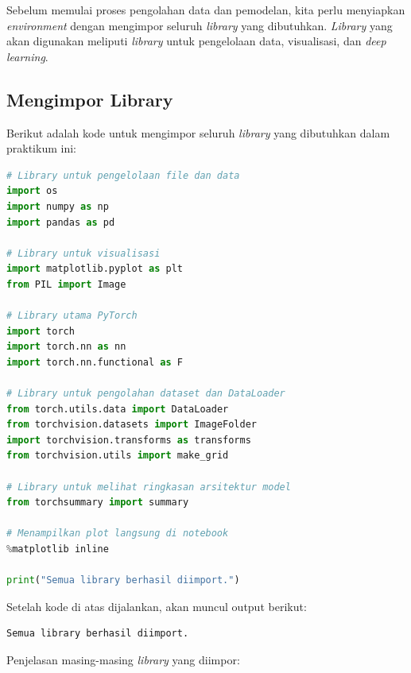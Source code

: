 Sebelum memulai proses pengolahan data dan pemodelan, kita perlu menyiapkan \textit{environment} dengan mengimpor seluruh \textit{library} yang dibutuhkan. \textit{Library} yang akan digunakan meliputi \textit{library} untuk pengelolaan data, visualisasi, dan \textit{deep learning}.

\subsection{Mengimpor Library}

Berikut adalah kode untuk mengimpor seluruh \textit{library} yang dibutuhkan dalam praktikum ini:

\begin{lstlisting}[language=Python, caption=Mengimpor library yang dibutuhkan]
# Library untuk pengelolaan file dan data
import os
import numpy as np
import pandas as pd

# Library untuk visualisasi
import matplotlib.pyplot as plt
from PIL import Image

# Library utama PyTorch
import torch
import torch.nn as nn
import torch.nn.functional as F

# Library untuk pengolahan dataset dan DataLoader
from torch.utils.data import DataLoader
from torchvision.datasets import ImageFolder
import torchvision.transforms as transforms
from torchvision.utils import make_grid

# Library untuk melihat ringkasan arsitektur model
from torchsummary import summary

# Menampilkan plot langsung di notebook
%matplotlib inline

print("Semua library berhasil diimport.")
\end{lstlisting}

Setelah kode di atas dijalankan, akan muncul output berikut:

\begin{outputcode}[H]
\begin{lstlisting}[language={}]
Semua library berhasil diimport.
\end{lstlisting}
\caption{Output impor library}
\end{outputcode}

Penjelasan masing-masing \textit{library} yang diimpor:


